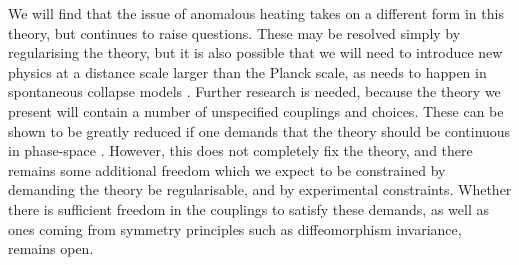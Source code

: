 \documentclass[aps,pra,showpacs,citeautoscript,amsmath,amssymb,floatfix,superscriptaddress,bbm, verbatim,amsfonts,changes,11pt,nofootinbib,longbibliography]{revtex4-2}
\begin{document}
We will find that the issue of anomalous heating takes on a different form in this theory,
	but continues to raise questions. These may be resolved simply by regularising the theory, but it is also possible that we will need to introduce new physics at a distance scale larger than the Planck scale, as needs to happen in spontaneous collapse models \cite{ballentine1991failure,gallis1991comparison,shimony1990desiderata,donadi2021underground}. %
	Further  research is needed, because the theory we present will contain a number of unspecified couplings and choices. These can be shown to be greatly reduced if one demands that the theory should be continuous in phase-space \cite{UCLPawula}. However, this does not completely fix the theory, and there remains some additional freedom which we expect to be constrained by demanding the theory be regularisable, and by experimental constraints. Whether there is sufficient freedom in the couplings to satisfy these demands, as well as ones coming from symmetry principles such as diffeomorphism invariance, remains open.
	
\end{document}
